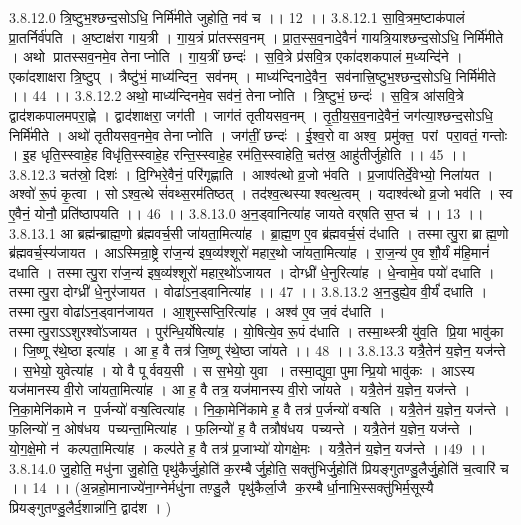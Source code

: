 3.8.12.0
त्रि॒ष्टुभ॒श्छन्द॒सोऽधि॒ निर्मि॑मीते जुहोति॒ नव॑ च ।। 12 ।।
3.8.12.1
सा॒वि॒त्रम॒ष्टाक॑पालं प्रा॒तर्निर्व॑पति । अ॒ष्टाक्ष॑रा गाय॒त्री । गा॒य॒त्रं प्रा॑तस्सव॒नम् । प्रा॒त॒स्स॒व॒नादे॒वैनं॑ गायत्रि॒याश्छन्द॒सोऽधि॒ निर्मि॑मीते । अथो प्रातस्सव॒नमे॒व तेनाप्नोति । गा॒य॒त्रीं छन्दः॑ । स॒वि॒त्रे प्र॑सवि॒त्र एका॑दशकपालं म॒ध्यन्दि॑ने । एका॑दशाक्षरा त्रि॒ष्टुप् । त्रैष्टु॑भं॒ माध्य॑न्दिन॒॒ सव॑नम् । माध्य॑न्दिनादे॒वैन॒॒ सव॑नात्त्रि॒ष्टुभ॒श्छन्द॒सोऽधि॒ निर्मि॑मीते ।। 44 ।।
3.8.12.2
अथो॒ माध्य॑न्दिनमे॒व सव॑नं॒ तेनाप्नोति । त्रि॒ष्टुभं॒ छन्दः॑ । स॒वि॒त्र आ॑सवि॒त्रे द्वाद॑शकपालमपरा॒ह्णे । द्वाद॑शाक्षरा॒ जग॑ती । जाग॑तं तृतीयसव॒नम् । तृ॒ती॒य॒स॒व॒नादे॒वैनं॒ जग॑त्या॒श्छन्द॒सोऽधि॒ निर्मि॑मीते । अथो॑ तृतीयसव॒नमे॒व तेनाप्नोति । जग॑तीं॒ छन्दः॑ । ई॒श्व॒रो वा अश्व॒ प्रमु॑क्त॒ परां परा॒वतं॒ गन्तोः । इ॒ह धृति॒स्स्वाहे॒ह विधृ॑ति॒स्स्वाहे॒ह रन्ति॒स्स्वाहे॒ह रम॑ति॒स्स्वाहेति॒ चत॑स्र॒ आहु॑तीर्जुहोति ।। 45 ।।
3.8.12.3
चत॑स्रो॒ दिशः॑ । दि॒ग्भिरे॒वैनं॒ परि॑गृह्णाति । आश्व॑त्थो व्र॒जो भ॑वति । प्र॒जाप॑तिर्दे॒वेभ्यो॒ निला॑यत । अश्वो॑ रू॒पं कृ॒त्वा । सोऽश्व॒त्थे सं॑वथ्स॒रम॑तिष्ठत् । तद॑श्व॒त्थस्याश्वत्थ॒त्वम् । यदाश्व॑त्थो व्र॒जो भव॑ति । स्व ए॒वैनं॒ योनौ॒ प्रति॑ष्ठापयति ।। 46 ।।
3.8.13.0
अ॒न॒ड्वानित्या॑ह जायते वर्‌षति स॒प्त च॑ ।। 13 ।।
3.8.13.1
आ ब्रह्म॑न्ब्राह्म॒णो ब्र॑ह्मवर्च॒सी जा॑यता॒मित्या॑ह । ब्रा॒ह्म॒ण ए॒व ब्र॑ह्मवर्च॒सं द॑धाति । तस्मात्पु॒रा ब्राह्म॒णो ब्र॑ह्मवर्च॒स्य॑जायत । आऽस्मिन्रा॒ष्ट्रे रा॑ज॒न्य॑ इष॒व्य॑श्शूरो॑ महार॒थो जा॑यता॒मित्या॑ह । रा॒ज॒न्य॑ ए॒व शौ॒र्यं म॑हि॒मानं॑ दधाति । तस्मात्पु॒रा रा॑ज॒न्य॑ इष॒व्य॑श्शूरो॑ महार॒थो॑ऽजायत । दोग्ध्री॑ धे॒नुरित्या॑ह । धे॒न्वामे॒व पयो॑ दधाति । तस्मात्पु॒रा दोग्ध्री॑ धे॒नुर॑जायत । वोढा॑ऽन॒ड्वानित्या॑ह ।। 47 ।।
3.8.13.2
अ॒न॒डुह्ये॒व वी॒र्यं॑ दधाति । तस्मात्पु॒रा वोढा॑ऽन॒ड्वान॑जायत । आ॒शुस्सप्ति॒रित्या॑ह । अश्व॑ ए॒व ज॒वं द॑धाति । तस्मात्पु॒राऽऽशुरश्वो॑ऽजायत । पुर॑न्धि॒र्योषेत्या॑ह । यो॒षित्ये॒व रू॒पं द॑धाति । तस्मा॒थ्स्त्री यु॑व॒ति प्रि॒या भावु॑का । जि॒ष्णू र॑थे॒ष्ठा इत्या॑ह । आ ह॒ वै तत्र॑ जि॒ष्णू र॑थे॒ष्ठा जा॑यते ।। 48 ।।
3.8.13.3
यत्रै॒तेन॑ य॒ज्ञेन॒ यज॑न्ते । स॒भेयो॒ युवेत्या॑ह । यो वै पूर्ववय॒सी । स स॒भेयो॒ युवा । तस्मा॒द्युवा॒ पुमान्प्रि॒यो भावु॑कः । आऽस्य यज॑मानस्य वी॒रो जा॑यता॒मित्या॑ह । आ ह॒ वै तत्र॒ यज॑मानस्य वी॒रो जा॑यते । यत्रै॒तेन॑ य॒ज्ञेन॒ यज॑न्ते । नि॒का॒मेनि॑कामे न प॒र्जन्यो॑ वऱ्ष॒त्वित्या॑ह । नि॒का॒मेनि॑कामे ह॒ वै तत्र॑ प॒र्जन्यो॑ वऱ्षति । यत्रै॒तेन॑ य॒ज्ञेन॒ यज॑न्ते । फ॒लिन्यो॑ न॒ ओष॑धय पच्यन्ता॒मित्या॑ह । फ॒लिन्यो॑ ह॒ वै तत्रौष॑धय पच्यन्ते । यत्रै॒तेन॑ य॒ज्ञेन॒ यज॑न्ते । यो॒ग॒क्षे॒मो न॑ कल्पता॒मित्या॑ह । कल्प॑ते ह॒ वै तत्र॑ प्र॒जाभ्यो॑ योगक्षे॒मः । यत्रै॒तेन॑ य॒ज्ञेन॒ यज॑न्ते ।।49 ।।
3.8.14.0
जु॒होति॒ मधु॑ना जु॒होति॒ पृथु॑कैर्जु॒होति॑ क॒रम्बैर्जु॒होति॒ सक्तु॑भिर्जु॒होति॑ प्रियङ्गुतण्डु॒लैर्जु॒होति॑ च॒त्वारि॑ च ।। 14 ।। (अ॒न्नहो॒मानाज्ये॑ना॒ग्नेर्मधु॑ना तण़्डु॒लै पृथु॑कैर्ला॒जै क॒रम्बैर्धा॒नाभि॒स्सक्तु॑भिर्म॒सूस्यै प्रियङ्गुतण्डु॒लैर्द॒शान्ना॑नि॒ द्वाद॑श । )
